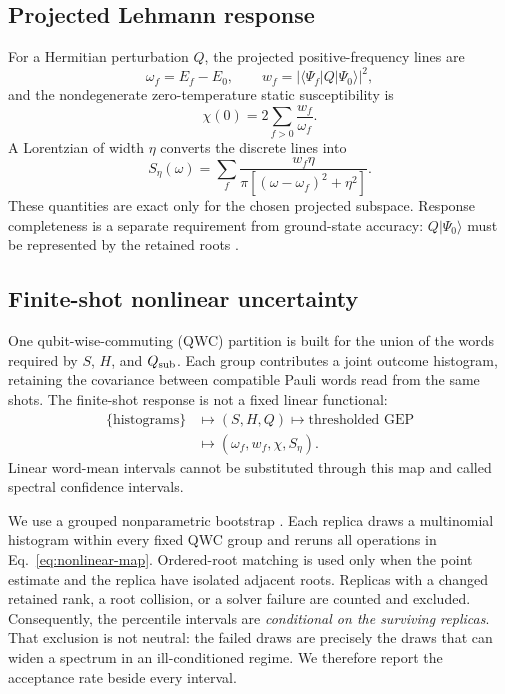 \documentclass[aps,pra,reprint,superscriptaddress,nofootinbib,floatfix]{revtex4-2}
\newcommand{\ket}[1]{\lvert #1\rangle}
\begin{document}
\subsection{Projected Lehmann response}
\label{sec:response}

For a Hermitian perturbation $Q$, the projected positive-frequency lines are
\begin{equation}
 \omega_f=E_f-E_0,\qquad
 w_f=|\langle\Psi_f|Q|\Psi_0\rangle|^2,
 \label{eq:lehmann}
\end{equation}
and the nondegenerate zero-temperature static susceptibility is
\begin{equation}
 \chi(0)=2\sum_{f>0}\frac{w_f}{\omega_f}.
 \label{eq:chi}
\end{equation}
A Lorentzian of width $\eta$ converts the discrete lines into
\begin{equation}
 S_\eta(\omega)=\sum_f
 \frac{w_f\eta}{\pi[(\omega-\omega_f)^2+\eta^2]}.
 \label{eq:broadening}
\end{equation}
These quantities are exact only for the chosen projected subspace.  Response
completeness is a separate requirement from ground-state accuracy:
$Q\ket{\Psi_0}$ must be represented by the retained roots
\cite{colless2018spectra,umeano2025response}.

\subsection{Finite-shot nonlinear uncertainty}
\label{sec:bootstrap}

One qubit-wise-commuting (QWC) partition
\cite{verteletskyi2020grouping} is built for the union of the words required
by $S$, $H$, and $Q_{\rm sub}$.  Each group contributes a joint outcome
histogram, retaining the covariance between compatible Pauli words read from
the same shots.  The finite-shot response is not a fixed linear functional:
\begin{align}
 \{\text{histograms}\}
 &\longmapsto(S,H,Q)
 \longmapsto\text{thresholded GEP}
 \nonumber\\
 &\longmapsto(\omega_f,w_f,\chi,S_\eta).
 \label{eq:nonlinear-map}
\end{align}
Linear word-mean intervals cannot be substituted through this map and called
spectral confidence intervals.

We use a grouped nonparametric bootstrap \cite{efron1979bootstrap}.  Each
replica draws a multinomial histogram within every fixed QWC group and reruns
all operations in Eq.~\eqref{eq:nonlinear-map}.  Ordered-root matching is used
only when the point estimate and the replica have isolated adjacent roots.
Replicas with a changed retained rank, a root collision, or a solver failure
are counted and excluded.  Consequently, the percentile intervals are
\emph{conditional on the surviving replicas}.  That exclusion is not neutral:
the failed draws are precisely the draws that can widen a spectrum in an
ill-conditioned regime.  We therefore report the acceptance rate beside every
interval.
\end{document}
